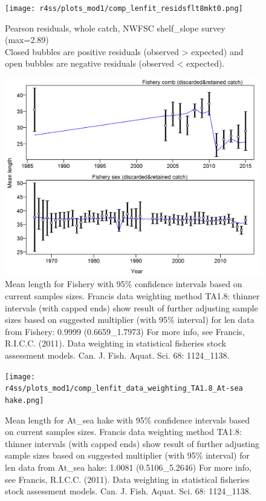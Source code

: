 \documentclass[12pt,]{article}
\begin{document}
\begin{figure}
\centering
\texttt{[image: r4ss/plots\_mod1/comp\_lenfit\_residsflt8mkt0.png]}
\caption{Pearson residuals, whole catch, NWFSC shelf\_slope survey
(max=2.89)\\
Closed bubbles are positive residuals (observed \textgreater{} expected)
and open bubbles are negative residuals (observed \textless{} expected).
\label{fig:nwfsc_combo_len_pearson}}
\end{figure}

\begin{figure}
\centering
\includegraphics{r4ss/plots_mod1/comp_lenfit_data_weighting_TA1.8_Fishery.png}
\caption{Mean length for Fishery with 95\% confidence intervals based on
current samples sizes. Francis data weighting method TA1.8: thinner
intervals (with capped ends) show result of further adjusting sample
sizes based on suggested multiplier (with 95\% interval) for len data
from Fishery: 0.9999 (0.6659\_1.7973) For more info, see Francis,
R.I.C.C. (2011). Data weighting in statistical fisheries stock
assessment models. Can. J. Fish. Aquat. Sci. 68: 1124\_1138.
\label{fig:weighting_len_fishery}}
\end{figure}

\begin{figure}
\centering
\texttt{[image: r4ss/plots\_mod1/comp\_lenfit\_data\_weighting\_TA1.8\_At-sea hake.png]}
\caption{Mean length for At\_sea hake with 95\% confidence intervals
based on current samples sizes. Francis data weighting method TA1.8:
thinner intervals (with capped ends) show result of further adjusting
sample sizes based on suggested multiplier (with 95\% interval) for len
data from At\_sea hake: 1.0081 (0.5106\_5.2646) For more info, see
Francis, R.I.C.C. (2011). Data weighting in statistical fisheries stock
assessment models. Can. J. Fish. Aquat. Sci. 68: 1124\_1138.
\label{fig:weighting_len_ashop}}
\end{figure}
\end{document}

